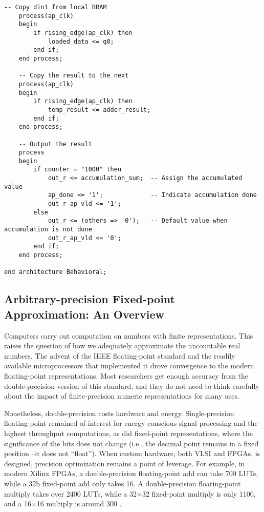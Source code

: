 \documentclass[12pt,american]{article}
\begin{document}
\begin{lstlisting}[style=vhdlStyle,caption=VHDL description of the Sequential Accumulator,label=lis:seq:RTL]
    -- Copy din1 from local BRAM
    process(ap_clk)
    begin
        if rising_edge(ap_clk) then
            loaded_data <= q0;
        end if;
    end process;

    -- Copy the result to the next 
    process(ap_clk)
    begin
        if rising_edge(ap_clk) then
            temp_result <= adder_result;    
        end if;
    end process;

    -- Output the result
    process
    begin
        if counter = "1000" then
            out_r <= accumulation_sum;  -- Assign the accumulated value
            ap_done <= '1';             -- Indicate accumulation done
            out_r_ap_vld <= '1';
        else
            out_r <= (others => '0');   -- Default value when accumulation is not done
            out_r_ap_vld <= '0';
        end if;
    end process;

end architecture Behavioral;
\end{lstlisting}

\subsection{Arbitrary-precision Fixed-point Approximation: An Overview}\label{sec:flopre}

Computers carry out computation on numbers with finite representations. This raises the question of how we adequately approximate the uncountable real numbers. The advent of the IEEE floating-point standard \citep{ieeefp1985} and the readily available microprocessors that implemented it drove convergence to the modern floating-point representations. Most researchers get enough accuracy from the double-precision version of this standard, and they do not need to think carefully about the impact of finite-precision numeric representations for many uses. 

Nonetheless, double-precision costs hardware and energy. Single-precision floating-point remained of interest for energy-conscious signal processing and the highest throughput computations, as did fixed-point representations, where the significance of the bits does not change (i.e., the decimal point remains in a fixed position --it does not ``float''). When custom hardware, both VLSI and FPGAs, is designed, precision optimization remains a point of leverage. For example, in modern Xilinx FPGAs, a double-precision floating-point add can take 700 LUTs, while a 32b fixed-point add only takes 16. A double-precision floating-point multiply takes over 2400 LUTs, while a 32$\times$32 fixed-point multiply is only 1100, and a 16$\times$16 multiply is around 300 \citep{xilinx_fp2020}.  
\end{document}
